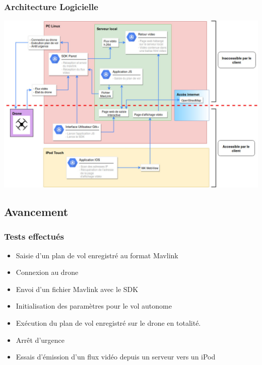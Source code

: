 \documentclass{beamer}
\begin{document}

	\begin{frame}
		\begin{center}
		\frametitle{Architecture Logicielle}
       
        \includegraphics[scale=0.3]{Architecture_logicielle_v2.jpg}
		\end{center}
	\end{frame}
	
	
	
	\begin{frame}
		\section{Avancement}
		\begin{center}
		\frametitle{Tests effectués}
           	\begin{itemize}
           	    \item Saisie d'un plan de vol enregistré au format Mavlink
                \item Connexion au drone
                \item Envoi d'un fichier Mavlink avec le SDK
                \item Initialisation des paramètres pour le vol autonome
                \item Exécution du plan de vol enregistré sur le drone en totalité.
                 \item Arrêt d'urgence
                \item Essais d'émission d'un flux vidéo depuis un serveur vers un iPod
            \end{itemize}
		\end{center}
	\end{frame}
\end{document}
